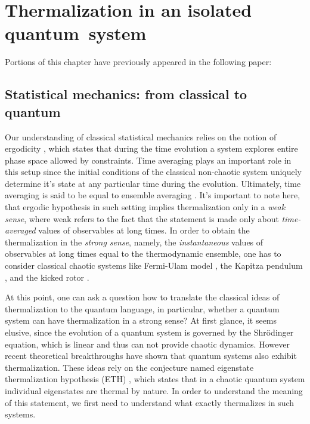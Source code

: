 
\chapter{Thermalization in an isolated quantum~system}

Portions of this chapter have previously appeared in the following paper:


\section{Statistical mechanics: from  classical to quantum}

Our understanding of classical statistical mechanics relies on the notion of ergodicity \cite{Penrose1970, Dalessio2016}, which states that during the time evolution a system explores entire phase space allowed by constraints. Time averaging plays an important role in this setup since the initial conditions of the classical non-chaotic system uniquely determine it's state at any particular time during the evolution. Ultimately, time averaging is said to be equal to ensemble averaging \cite{Penrose1970, Dalessio2016}. It's important to note here, that ergodic hypothesis in such setting implies thermalization only in a \textit{weak sense}, where weak refers to the fact that the statement is made only about \textit{time-averaged} values of observables at long times. In order to obtain the thermalization in the \textit{strong sense}, namely, the \textit{instantaneous} values of observables at long times equal to the thermodynamic ensemble, one has to consider classical chaotic systems like Fermi-Ulam model \cite{Lichtenberg1992}, the Kapitza pendulum \cite{Broer2004}, and the kicked rotor \cite{Chirikov1979}.

At this point, one can ask a question how to translate the classical ideas of thermalization to the quantum language, in particular, whether a quantum system can have thermalization in a strong sense? At first glance, it seems elusive, since the evolution of a quantum system is governed by the Shr\"odinger equation, which is linear and thus can not provide chaotic dynamics. However recent theoretical breakthroughs \cite{Deutsch1991, Srednicki1994, Rigol2008} have shown that quantum systems also exhibit thermalization. These ideas rely on the conjecture named eigenstate thermalization hypothesis (ETH) \cite{Srednicki1999}, which states that in a chaotic quantum system individual eigenstates are thermal by nature. In order to understand the meaning of this statement, we first need to understand what exactly thermalizes in such systems.

